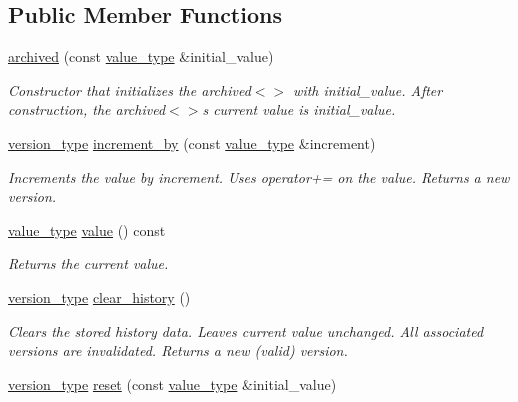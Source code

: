 \subsection*{Public Member Functions}
\begin{DoxyCompactItemize}
\item 
\hyperlink{classarchived_a752f1c457d9431caab148b866fc34c0f}{archived} (const \hyperlink{classarchived_a0f6c13c55e504fe3bbfc04f3896e5abc}{value\+\_\+type} \&initial\+\_\+value)
\begin{DoxyCompactList}\small\item\em Constructor that initializes the archived$<$$>$ with initial\+\_\+value. After construction, the archived$<$$>$\textquotesingle{}s current value is initial\+\_\+value. \end{DoxyCompactList}\item 
\hyperlink{classarchived_a75b8e571e7c6aca9432b9aa2ba601c00}{version\+\_\+type} \hyperlink{classarchived_a8d1c7030894bf31b7add0bccd041d69a}{increment\+\_\+by} (const \hyperlink{classarchived_a0f6c13c55e504fe3bbfc04f3896e5abc}{value\+\_\+type} \&increment)
\begin{DoxyCompactList}\small\item\em Increments the value by increment. Uses operator+= on the value. Returns a new version. \end{DoxyCompactList}\item 
\hyperlink{classarchived_a0f6c13c55e504fe3bbfc04f3896e5abc}{value\+\_\+type} \hyperlink{classarchived_af69a2753a3b9844609a4b2684e4e0bf3}{value} () const 
\begin{DoxyCompactList}\small\item\em Returns the current value. \end{DoxyCompactList}\item 
\hyperlink{classarchived_a75b8e571e7c6aca9432b9aa2ba601c00}{version\+\_\+type} \hyperlink{classarchived_a5af939f79bddf33f8773fcb89016a85d}{clear\+\_\+history} ()
\begin{DoxyCompactList}\small\item\em Clears the stored history data. Leaves current value unchanged. All associated versions are invalidated. Returns a new (valid) version. \end{DoxyCompactList}\item 
\hyperlink{classarchived_a75b8e571e7c6aca9432b9aa2ba601c00}{version\+\_\+type} \hyperlink{classarchived_ae76263bf1bcd3dd0f6023c8142691a6c}{reset} (const \hyperlink{classarchived_a0f6c13c55e504fe3bbfc04f3896e5abc}{value\+\_\+type} \&initial\+\_\+value)

\end{DoxyCompactItemize}
